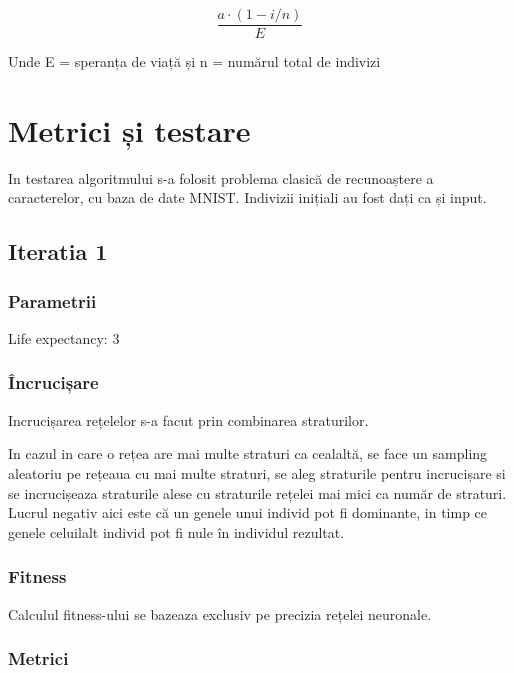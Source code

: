 \documentclass[11pt]{article}
\begin{document}
    \[\frac{a \cdot (1 - i / n)}{E}\]

Unde E = speranța de viață și n = numărul total de indivizi

    \hypertarget{metrici-ux219i-testare}{%
\section{Metrici și testare}\label{metrici-ux219i-testare}}

In testarea algoritmului s-a folosit problema clasică de recunoaștere a
caracterelor, cu baza de date MNIST. Indivizii inițiali au fost dați ca
și input.

    \hypertarget{iteratia-1}{%
\subsection{Iteratia 1}\label{iteratia-1}}

\hypertarget{parametrii}{%
\subsubsection{Parametrii}\label{parametrii}}

Life expectancy: 3

\hypertarget{uxeencruciux219are}{%
\subsubsection{Încrucișare}\label{uxeencruciux219are}}

Incrucișarea rețelelor s-a facut prin combinarea straturilor.

In cazul in care o rețea are mai multe straturi ca cealaltă, se face un
sampling aleatoriu pe rețeaua cu mai multe straturi, se aleg straturile
pentru incrucișare si se incrucișeaza straturile alese cu straturile
rețelei mai mici ca număr de straturi. Lucrul negativ aici este că un
genele unui individ pot fi dominante, in timp ce genele celuilalt
individ pot fi nule în individul rezultat.

\hypertarget{fitness}{%
\subsubsection{Fitness}\label{fitness}}

Calculul fitness-ului se bazeaza exclusiv pe precizia rețelei neuronale.

\hypertarget{metrici}{%
\subsubsection{Metrici}\label{metrici}}
\end{document}
